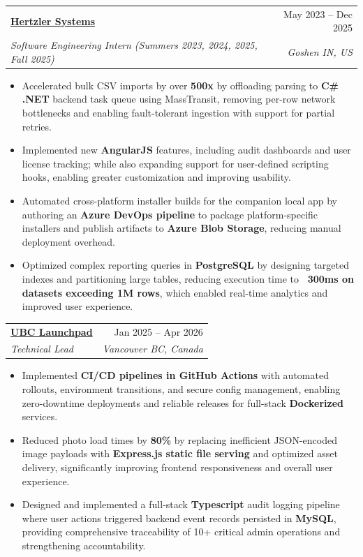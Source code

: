 \documentclass[letterpaper,11pt]{article}
\makeatletter
\newcommand{\resumeItem}[1]{
  \item\small{
    {#1 \vspace{-2pt}}
  }
}
\newcommand{\resumeSubheading}[4]{
  \vspace{-2pt}\item
    \begin{tabular*}{\textwidth}[t]{l@{\extracolsep{\fill}}r}
      \textbf{#1} & #2 \\[-1pt]
      \textit{\small#3} & \textit{\small #4} \\
    \end{tabular*}\vspace{-7pt}
}
\newcommand{\resumeItemListStart}{\begin{itemize}}
\newcommand{\resumeItemListEnd}{\end{itemize}\vspace{-7pt}}
\makeatother
\begin{document}
  \resumeSubheading{\href{https://www.hertzler.com}{Hertzler Systems}}{May 2023 -- Dec 2025}{Software Engineering Intern (Summers 2023, 2024, 2025, Fall 2025)}{Goshen IN, US}
  \resumeItemListStart
    \resumeItem{Accelerated bulk CSV imports by over \textbf{500x} by offloading parsing to \textbf{C\# .NET} backend task queue using MassTransit, removing per-row network bottlenecks and enabling fault-tolerant ingestion with support for partial retries.}
    \resumeItem{Implemented new \textbf{AngularJS} features, including audit dashboards and user license tracking; while also expanding support for user-defined scripting hooks, enabling greater customization and improving usability.}
    \resumeItem{Automated cross-platform installer builds for the companion local app by authoring an \textbf{Azure DevOps pipeline} to package platform-specific installers and publish artifacts to \textbf{Azure Blob Storage}, reducing manual deployment overhead.}
    \resumeItem{Optimized complex reporting queries in \textbf{PostgreSQL} by designing targeted indexes and partitioning large tables, reducing execution time to \textbf{~300ms on datasets exceeding 1M rows}, which enabled real-time analytics and improved user experience.}
  \resumeItemListEnd


  \resumeSubheading{\href{https://ubclaunchpad.com}{UBC Launchpad}}{Jan 2025 -- Apr 2026}{Technical Lead}{Vancouver BC, Canada}
  \resumeItemListStart
    \resumeItem{Implemented \textbf{CI/CD pipelines in GitHub Actions} with automated rollouts, environment transitions, and secure config management, enabling zero-downtime deployments and reliable releases for full-stack \textbf{Dockerized} services.}
    \resumeItem{Reduced photo load times by \textbf{80\%} by replacing inefficient JSON-encoded image payloads with \textbf{Express.js static file serving} and optimized asset delivery, significantly improving frontend responsiveness and overall user experience.}
    \resumeItem{Designed and implemented a full-stack \textbf{Typescript} audit logging pipeline where user actions triggered backend event records persisted in \textbf{MySQL}, providing comprehensive traceability of 10+ critical admin operations and strengthening accountability.}
  \resumeItemListEnd
\end{document}
